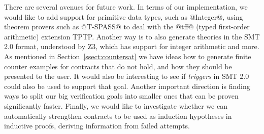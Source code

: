 
There are several avenues for future work. 
In terms of our implementation, we would like 
to add support for primitive data types, such as @Integer@, using 
theorem provers such as @T-SPASS@ to deal with the @tff@ (typed first-order arithmetic)
extension TPTP. Another way is to also 
generate theories in the SMT 2.0 format, understood by Z3, which has support 
for integer arithmetic and more. As mentioned in Section~\ref{ssect:countersat} 
we have ideas how to generate finite counter examples for contracts that do not 
hold, and how they should be presented to the user. It would also be interesting 
to see if \emph{triggers} in SMT 2.0 could also be used to support that goal. 
Another important direction is finding ways to split our big verification goals
into smaller ones that can be proven significantly faster. Finally, we would like
to investigate whether we can automatically strengthen contracts to be used as 
induction hypotheses in inductive proofs, deriving information from failed attempts.


